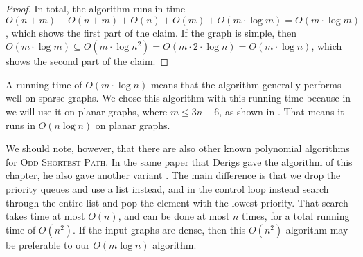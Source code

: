\begin{theorem}
\begin{proof}
        In total, the algorithm runs in time $O(n+m) + O(n+m) + O(n) + O(m) + O(m \cdot \log m) = O(m \cdot \log m)$, which shows the first part of the claim. If the graph is simple, then $O(m \cdot \log m) \subseteq O(m \cdot \log n^2) = O(m \cdot 2 \cdot \log n) = O(m \cdot \log n)$, which shows the second part of the claim.
    \end{proof}        
\end{theorem}

A running time of $O(m \cdot \log n)$ means that the algorithm generally performs well on sparse graphs. We chose this algorithm with this running time because in  we will use it on planar graphs, where $m \leq 3n-6$, as shown in . That means it runs in $O(n \log n)$ on planar graphs.

We should note, however, that there are also other known polynomial algorithms for \textsc{Odd Shortest Path}. In the same paper that Derigs gave the algorithm of this chapter, he also gave another variant \cite{source:derigs_shortest_odd_path}. The main difference is that we drop the priority queues and use a list instead, and in the control loop instead search through the entire list and pop the element with the lowest priority. That search takes time at most $O(n)$, and can be done at most $n$ times, for a total running time of $O(n^2)$. If the input graphs are dense, then this $O(n^2)$ algorithm may be preferable to our $O(m \log n)$ algorithm.


